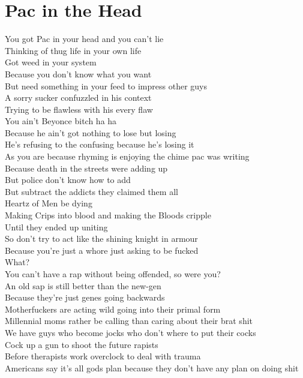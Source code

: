 \documentclass[12pt, b5paper]{article}
\begin{document}
\section{Pac in the Head}
You got Pac in your head and you can't lie 
\\Thinking of thug life in your own life 
\\Got weed in your system 
\\Because you don't know what you want 
\\But need something in your feed to impress other guys 
\\A sorry sucker confuzzled in his context 
\\Trying to be flawless with his every flaw 
\\You ain't Beyonce bitch ha ha 
\\Because he ain't got nothing to lose but losing 
\\He's refusing to the confusing because he's losing it 
\\As you are because rhyming is enjoying the chime pac was writing 
\\Because death in the streets were adding up
\\But police don't know how to add
\\But subtract the addicts they claimed them all 
\\Heartz of Men be dying 
\\Making Crips into blood and making the Bloods cripple 
\\Until they ended up uniting 
\\So don't try to act like the shining knight in armour 
\\Because you're just a whore just asking to be fucked
\\What?
\\You can't have a rap without being offended, so were you?
\\An old sap is still better than the new-gen 
\\Because they're just genes going backwards
\\Motherfuckers are acting wild going into their primal form
\\Millennial moms rather be calling than caring about their brat shit 
\\We have guys who become jocks who don't where to put their cocks
\\Cock up a gun to shoot the future rapists
\\Before therapists work overclock to deal with trauma 
\\Americans say it's all gods plan because they don't have any plan on doing shit 
\end{document}
